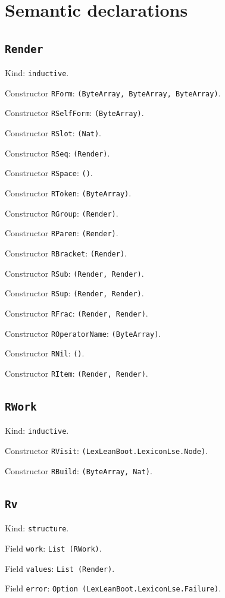 \documentclass[11pt]{article}
\begin{document}
\section*{Semantic declarations}
\subsection*{\texttt{Render}}
\noindent Kind: \texttt{inductive}.\par
\noindent Constructor \texttt{RForm}: \texttt{(ByteArray, ByteArray, ByteArray)}.\par
\noindent Constructor \texttt{RSelfForm}: \texttt{(ByteArray)}.\par
\noindent Constructor \texttt{RSlot}: \texttt{(Nat)}.\par
\noindent Constructor \texttt{RSeq}: \texttt{(Render)}.\par
\noindent Constructor \texttt{RSpace}: \texttt{()}.\par
\noindent Constructor \texttt{RToken}: \texttt{(ByteArray)}.\par
\noindent Constructor \texttt{RGroup}: \texttt{(Render)}.\par
\noindent Constructor \texttt{RParen}: \texttt{(Render)}.\par
\noindent Constructor \texttt{RBracket}: \texttt{(Render)}.\par
\noindent Constructor \texttt{RSub}: \texttt{(Render, Render)}.\par
\noindent Constructor \texttt{RSup}: \texttt{(Render, Render)}.\par
\noindent Constructor \texttt{RFrac}: \texttt{(Render, Render)}.\par
\noindent Constructor \texttt{ROperatorName}: \texttt{(ByteArray)}.\par
\noindent Constructor \texttt{RNil}: \texttt{()}.\par
\noindent Constructor \texttt{RItem}: \texttt{(Render, Render)}.\par
\subsection*{\texttt{RWork}}
\noindent Kind: \texttt{inductive}.\par
\noindent Constructor \texttt{RVisit}: \texttt{(LexLeanBoot.LexiconLse.Node)}.\par
\noindent Constructor \texttt{RBuild}: \texttt{(ByteArray, Nat)}.\par
\subsection*{\texttt{Rv}}
\noindent Kind: \texttt{structure}.\par
\noindent Field \texttt{work}: \texttt{List (RWork)}.\par
\noindent Field \texttt{values}: \texttt{List (Render)}.\par
\noindent Field \texttt{error}: \texttt{Option (LexLeanBoot.LexiconLse.Failure)}.\par
\end{document}
